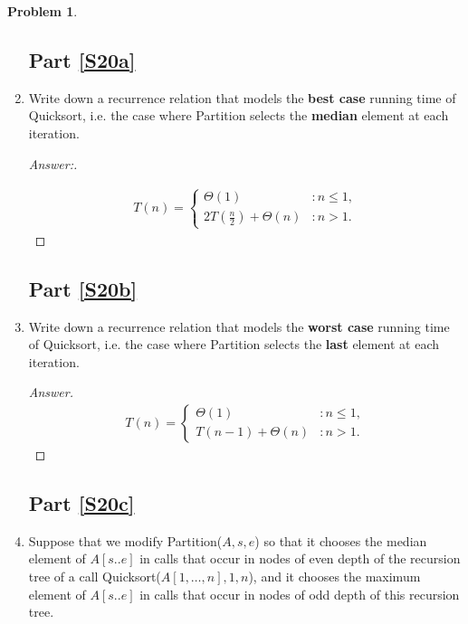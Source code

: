 \documentclass[11pt]{article}
\theoremstyle{definition}
\theoremstyle{definition}
\newtheorem{required}{Problem}
\theoremstyle{definition}
\begin{document}
\begin{required}
\begin{enumerate}[label=(\alph*)]
\subsection{Part \ref{S20a}}

\item \label{S20a} Write down a recurrence relation that models the {\bf best case} running time of Quicksort, i.e. the case where {\sc Partition} selects the {\bf median} element at each iteration.

\begin{proof}[Answer:] \

\begin{align*}
T(n) = \begin{cases}
\text{$\Theta(1)$} & : n \leq 1, \\
\text{$2T(\frac{n}{2}) + \Theta(n)$} & : n > 1.
\end{cases}
\end{align*}
\end{proof}


\newpage 
\subsection{Part \ref{S20b}}
\item \label{S20b} Write down a recurrence relation that models the {\bf worst case} running time of Quicksort, i.e. the case where {\sc Partition} selects the {\bf last} element at each iteration.

\begin{proof}[Answer]
\begin{align*}
T(n) = \begin{cases}
\text{$\Theta(1)$} & : n \leq 1, \\
\text{$T(n -1) + \Theta(n)$} & : n > 1.
\end{cases}
\end{align*}
\end{proof}



\newpage
\subsection{Part \ref{S20c} }

\item \label{S20c} Suppose that we modify {\sc Partition}($A,s,e$) so that it chooses the median element of $A[s..e]$ in calls that occur in nodes of even depth of the recursion tree of a call {\sc Quicksort}($A[1, \ldots, n],1, n$), and it chooses the maximum element of $A[s..e]$ in calls that occur in nodes of odd depth of this recursion tree. \\
  

\end{enumerate}
\end{required}
\end{document}
